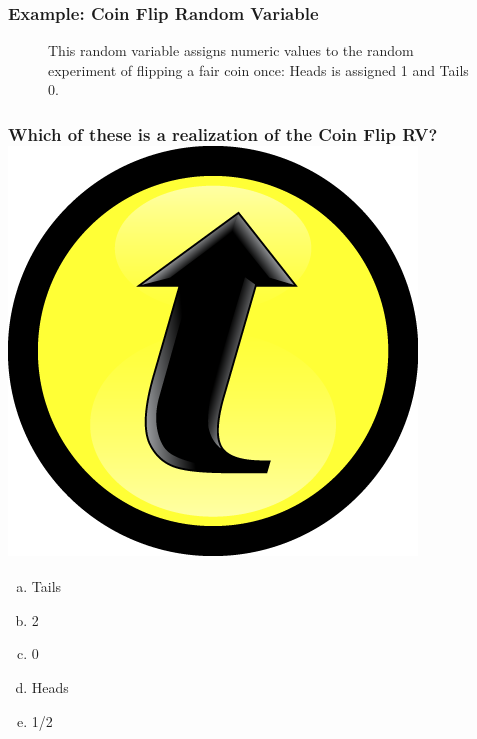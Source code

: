 \documentclass[handout]{beamer}
\begin{document}
\begin{frame}
\frametitle{Example: Coin Flip Random Variable}

\begin{figure}
\centering
{}
\caption{This random variable assigns numeric values to the random experiment of flipping a fair coin once: Heads is assigned 1 and Tails 0.}
\end{figure}
\end{frame}
\begin{frame}
  \frametitle{Which of these is a realization of the Coin Flip RV?\hfill\includegraphics[scale = 0.05]{./images/clicker}}
  \begin{enumerate}[(a)]
    \item Tails
    \item 2
    \item 0 
    \item Heads
    \item 1/2
  \end{enumerate}
\end{frame}
\end{document}
